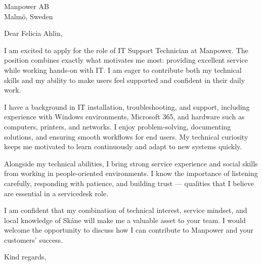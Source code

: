 \documentclass[a4paper,11pt]{letter}
\date{\today}
\begin{document}
\begin{letter}{Manpower AB\\Malmö, Sweden}

\opening{Dear Felicia Ahlin,}

I am excited to apply for the role of IT Support Technician at Manpower. The position combines exactly what motivates me most: providing excellent service while working hands-on with IT. I am eager to contribute both my technical skills and my ability to make users feel supported and confident in their daily work.

I have a background in IT installation, troubleshooting, and support, including experience with Windows environments, Microsoft 365, and hardware such as computers, printers, and networks. I enjoy problem-solving, documenting solutions, and ensuring smooth workflows for end users. My technical curiosity keeps me motivated to learn continuously and adapt to new systems quickly.

Alongside my technical abilities, I bring strong service experience and social skills from working in people-oriented environments. I know the importance of listening carefully, responding with patience, and building trust — qualities that I believe are essential in a servicedesk role.

I am confident that my combination of technical interest, service mindset, and local knowledge of Skåne will make me a valuable asset to your team. I would welcome the opportunity to discuss how I can contribute to Manpower and your customers’ success.

\closing{Kind regards,}

\end{letter}
\end{document}
